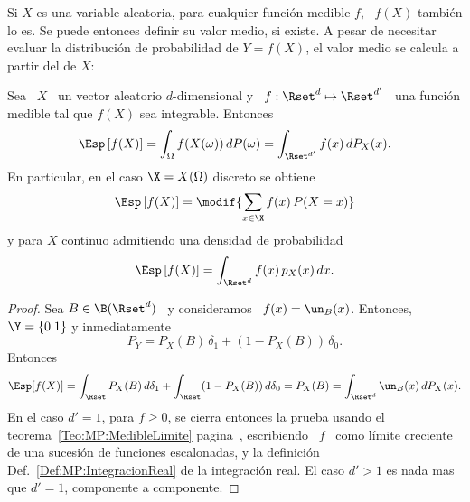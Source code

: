 Si $X$ es una variable aleatoria, para cualquier funci\'on medible $f$, \ $f(X)$
tambi\'en lo es.   Se puede entonces definir su valor medio,  si existe. A pesar
de necesitar evaluar  la distribuci\'on de probabilidad de $Y  = f(X)$, el valor
medio se calcula a partir del de $X$:
%
\begin{teorema}
\label{Teo:MP:Transferencia}
%
  Sea  \ $X$  \ un  vector  aleatorio $d$-dimensional  y \  $f: \Rset^d  \mapsto
  \Rset^{d'}$ \ una funci\'on medible tal que $f(X)$ sea integrable. Entonces
  \[
  \Esp\left[   f(X)  \right]   =  \int_\Omega   f(X(\omega))  \,   dP(\omega)  =
  \int_{\Rset^{d'}} f(x) \, dP_X(x).
  \]
  En particular, en el caso $\X = X(\Omega)$ discreto se obtiene
  \[
  \Esp\left[ f(X) \right] = \modif{\sum_{x \in \X} f(x) \, P(X = x)}
  \]
  y para $X$ continuo admitiendo una densidad de probabilidad
  \[
  \Esp\left[ f(X) \right] = \int_{\Rset^d} f(x) \, p_X(x) \, dx.
  \]
\end{teorema}
%
\begin{proof}
  Sea $B \in \B(\Rset^d)$ \ y consideramos \ $f(x) = \un_B(x)$. Entonces, $\Y
  = \{  0 \;  1 \}$ y inmediatamente
  \[
  P_Y = P_X(B) \, \delta_1 + (1-P_X(B)) \, \delta_0.
  \]
  Entonces
  \[
  \Esp[f(X)]  =  \int_\Rset  P_X(B)  \,  d\delta_1 +  \int_\Rset  (1-P_X(B))  \,
  d\delta_0 = P_X(B) = \int_{\Rset^d} \un_B(x) \, dP_X(x).
  \]
  En el caso  $d' = 1$, para $f  \ge 0$, se cierra entonces la  prueba usando el
  teorema~\ref{Teo:MP:MedibleLimite}         pagina~\pageref{Teo:MP:MedibleLimite},
  escribiendo \  $f$ \  como l\'imite creciente  de una sucesi\'on  de funciones
  escalonadas,  y   la  definici\'on  Def.~\ref{Def:MP:IntegracionReal}   de  la
  integraci\'on real. El  caso $d' > 1$ es  nada mas que $d' =  1$, componente a
  componente.
\end{proof}

